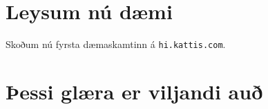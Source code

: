 \section{Leysum nú dæmi}
{
    {
        \item<1-> Skoðum nú fyrsta dæmaskamtinn á \texttt{hi.kattis.com}.
    }
}

\section{Þessi glæra er viljandi auð}
{
}



